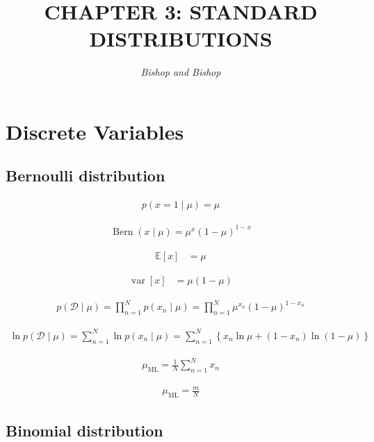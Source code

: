 \documentclass{article}
\title{\LARGE\scshape\MakeUppercase{Chapter 3: Standard Distributions}}
\author{\textit{Bishop and Bishop}}
\date{}
\begin{document}
\maketitle

\section{Discrete Variables}

\subsection{Bernoulli distribution}

\begin{align*}
p(x=1 \mid \mu)=\mu
\tag{3.1}
\end{align*}

\begin{align*}
\operatorname{Bern}(x \mid \mu)=\mu^{x}(1-\mu)^{1-x}
\tag{3.2}
\end{align*}

\begin{align*}
\mathbb{E}[x] &= \mu
\tag{3.3}
\end{align*}

\begin{align*}
\operatorname{var}[x] &= \mu(1-\mu)
\tag{3.4}
\end{align*}

\begin{align*}
p(\mathcal{D} \mid \mu)=\prod_{n=1}^{N} p(x_{n} \mid \mu)=\prod_{n=1}^{N} \mu^{x_{n}}(1-\mu)^{1-x_{n}}
\tag{3.5}
\end{align*}

\begin{align*}
\ln p(\mathcal{D} \mid \mu)=\sum_{n=1}^{N} \ln p(x_{n} \mid \mu)=\sum_{n=1}^{N}\left\{x_{n} \ln \mu+(1-x_{n}) \ln (1-\mu)\right\}
\tag{3.6}
\end{align*}

\begin{align*}
\mu_{\mathrm{ML}}=\frac{1}{N} \sum_{n=1}^{N} x_{n}
\tag{3.7}
\end{align*}

\begin{align*}
\mu_{\mathrm{ML}}=\frac{m}{N}
\tag{3.8}
\end{align*}

\subsection{Binomial distribution}
\end{document}
